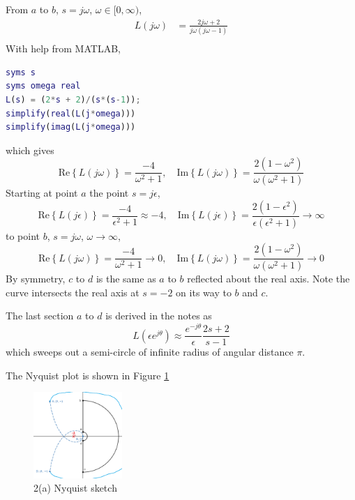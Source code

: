 From $a$ to $b$, $s = j \omega$, $\omega \in [0, \infty)$,
\begin{align*}
    L(j \omega) &= \frac{2j \omega + 2}{j \omega (j \omega - 1)} \\
\end{align*}
With help from MATLAB, 
\begin{lstlisting}[language=Matlab]
syms s 
syms omega real
L(s) = (2*s + 2)/(s*(s-1));
simplify(real(L(j*omega)))
simplify(imag(L(j*omega)))
\end{lstlisting}
which gives
\begin{equation*}
    \text{Re} \left\{ L(j \omega) \right\} = \frac{-4}{\omega^2 + 1}, \quad \text{Im} \left\{ L(j \omega) \right\} = \frac{2 (1 - \omega^2)}{\omega (\omega^2 + 1)}
\end{equation*}
Starting at point $a$ the point $s = j \epsilon$, 
\begin{equation*}
    \text{Re} \left\{ L(j \epsilon) \right\} = \frac{-4}{\epsilon^2 + 1} \approx -4, \quad \text{Im} \left\{ L(j \epsilon) \right\} 
    = \frac{2 (1 - \epsilon^2)}{\epsilon (\epsilon^2 + 1)} \to \infty
\end{equation*}
to point $b$, $s = j \omega$, $\omega \to \infty$,
\begin{equation*}
    \text{Re} \left\{ L(j \omega) \right\} = \frac{-4}{\omega^2 + 1} \to 0, \quad \text{Im} \left\{ L(j \omega) \right\} 
    = \frac{2 (1 - \omega^2)}{\omega (\omega^2 + 1)} \to 0
\end{equation*}
By symmetry, $c$ to $d$ is the same as $a$ to $b$ reflected about the real axis. Note the curve intersects the real axis at $s = -2$ on its 
way to $b$ and $c$.

The last section $a$ to $d$ is derived in the notes as 
\begin{equation*}
    L(\epsilon e^{j \theta}) \approx \frac{e^{-j \theta}}{\epsilon} \frac{2s + 2}{s-1}
\end{equation*}
which sweeps out a semi-circle of infinite radius of angular distance $\pi$. 

The Nyquist plot is shown in Figure \ref{fig:Q2Sketch}
\begin{figure}[h]
    \centering
    \includegraphics[width=0.3\textwidth]{Questions/Figures/Q2Sketch.png}
    \caption{2(a) Nyquist sketch}
    \label{fig:Q2Sketch}
\end{figure}

